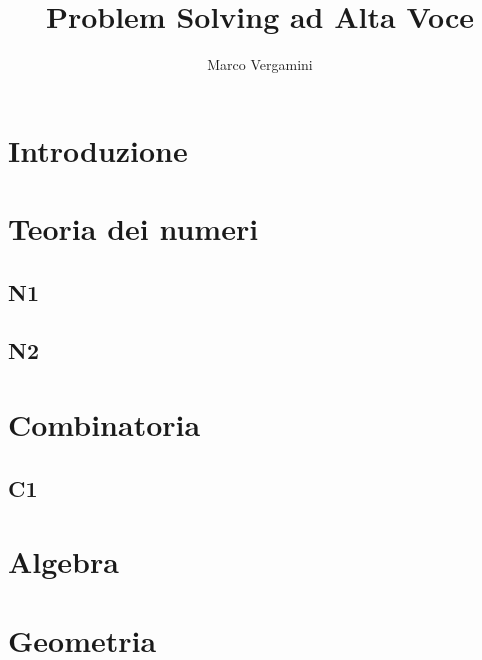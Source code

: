 \documentclass{article}
\title{Problem Solving ad Alta Voce}
\date{}
\author{Marco Vergamini}
\begin{document}
\maketitle
\newpage
\tableofcontents
\newpage


\section{Introduzione}


\newpage

\section{Teoria dei numeri}

\subsection{N1}


\subsection{N2}


\newpage

\section{Combinatoria}

\subsection{C1}


\newpage

\section{Algebra}

\newpage

\section{Geometria}
\end{document}
